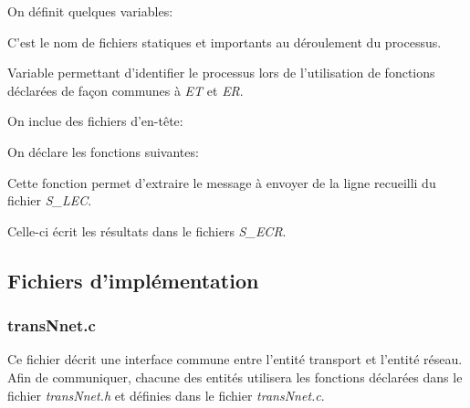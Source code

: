 \documentclass[11pt,french]{article}
\begin{document}
            \vspace{0.5cm}
            
            On définit quelques variables:
            
            C'est le nom de fichiers statiques et importants au déroulement du processus.

            
            Variable permettant d'identifier le processus lors de l'utilisation de fonctions déclarées de façon communes à \emph{ET} et \emph{ER}.
            
            \vspace{0.5cm}

            On inclue des fichiers d'en-tête:
            

            \vspace{0.5cm}

            On déclare les fonctions suivantes:
            
            Cette fonction permet d'extraire le message à envoyer de la ligne recueilli du fichier \emph{S\_LEC}.
            
            Celle-ci écrit les résultats dans le fichiers \emph{S\_ECR}.
    \subsection{Fichiers d'implémentation} %
    \label{sub:fich-implementation-trans-entity}
        \subsubsection{transNnet.c} %
        \label{ssub:transNnet.c}
            Ce fichier décrit une interface commune entre l'entité transport et l'entité réseau. Afin de communiquer, chacune des entités utilisera les fonctions déclarées dans le fichier
            \emph{transNnet.h} et définies dans le fichier \emph{transNnet.c}.
\end{document}
